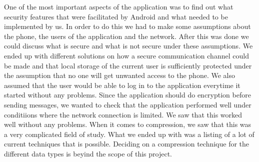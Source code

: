 \newline
\newline
One of the most important aspects of the application was to find out what security features that were facilitated by Android and what needed to be implemented by us. In order to do this we had to make some assumptions about the phone, the users of the application and the network. After this was done we could discuss what is secure and what is not secure under these assumptions. We ended up with different solutions on how a secure communication channel could be made and that local storage of the current user is sufficiently protected under the assumption that no one will get unwanted access to the phone. We also assumed that the user would be able to log in to the application everytime it started without any problems.
\newline
\newline
Since the application should do encryption before sending messages, we wanted to check that the application performed well under conditiions where the network connection is limited. We saw that this worked well without any problems.
\newline
\newline
When it comes to compression, we saw that this was a very complicated field of study. What we ended up with was a listing of a lot of current techniques that is possible. Deciding on a compression technique for the different data types is beyind the scope of this project.
